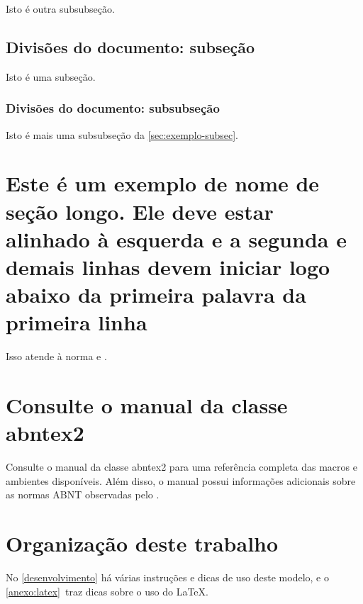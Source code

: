 Isto é outra subsubseção.


\subsection{Divisões do documento: subseção}\label{sec:exemplo-subsec}

Isto é uma subseção.


\subsubsection{Divisões do documento: subsubseção}

Isto é mais uma subsubseção da \autoref{sec:exemplo-subsec}.


\section{Este é um exemplo de nome de seção longo. Ele deve estar alinhado à esquerda e a segunda e demais linhas devem iniciar logo abaixo da primeira palavra da primeira linha}

Isso atende à norma  e .


\section{Consulte o manual da classe \textsf{abntex2}}

Consulte o manual da classe \textsf{abntex2} \cite{abntex2classe} para uma referência completa das macros e ambientes disponíveis.
  Além disso, o manual possui informações adicionais sobre as normas ABNT observadas pelo \abnTeX.


\section{Organização deste trabalho}

No \autoref{desenvolvimento} há várias instruções e dicas de uso deste modelo, e o \autoref{anexo:latex}~traz dicas sobre o uso do \LaTeX.
